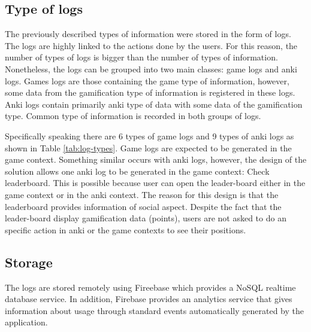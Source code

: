 \subsection{Type of logs}
The previously described types of information were stored in the form of logs. The logs are highly linked to the actions done by the users. For this reason, the number of types of logs is bigger than the number of types of information. Nonetheless, the logs can be grouped into two main classes: game logs and anki logs. Games logs are those containing the game type of information, however, some data from the gamification type of information is registered in these logs. Anki logs contain primarily anki type of data with some data of the gamification type. Common type of information is recorded in both groups of logs.

Specifically speaking there are 6 types of game logs and 9 types of anki logs as shown in Table \ref{tab:log-types}. Game logs are expected to be generated in the game context. Something similar occurs with anki logs, however, the design of the solution allows one anki log to be generated in the game context: Check leaderboard. This is possible because user can open the leader-board either in the game context or in the anki context. The reason for this design is that the leaderboard provides information of social aspect. Despite the fact that the leader-board display gamification data (points), users are not asked to do an specific action in anki or the game contexts to see their positions.

\subsection{Storage}
The logs are stored remotely using Fireebase which provides a NoSQL realtime database service. In addition, Firebase provides an analytics service that gives information about usage through standard events automatically generated by the application.
